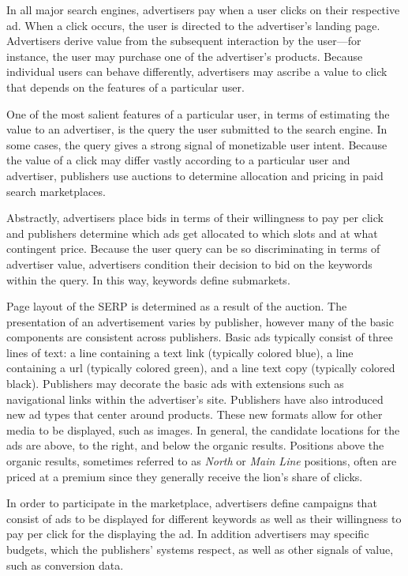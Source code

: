 \documentclass[prodmode,acmtist]{acmsmall} %
\begin{document}
In all major search engines, advertisers pay when a user clicks on their respective ad.  
When a click occurs, the user is directed to the advertiser's landing page.  
Advertisers derive value from the subsequent interaction by the user---for instance, the user may purchase one of the advertiser's products.  
Because individual users can behave differently, advertisers may ascribe a value to click that depends on the features of a particular user. 

One of the most salient features of a particular user, in terms of estimating the value to an advertiser, is the query the user submitted to the search engine.  
In some cases, the query gives a strong signal of monetizable user intent.  
Because the value of a click may differ vastly according to a particular user and advertiser, publishers use auctions to determine allocation and pricing in paid search marketplaces. 

Abstractly, advertisers place bids in terms of their willingness to pay per click and publishers determine which ads get allocated to which slots and at what contingent price.  
Because the user query can be so discriminating in terms of advertiser value, advertisers condition their decision to bid on the keywords within the query.  
In this way, keywords define submarkets. 

Page layout of the SERP is determined as a result of the auction.
The presentation of an advertisement varies by publisher, however many of the basic components are consistent across publishers.
Basic ads typically consist of three lines of text: a line containing a text link (typically colored blue), a line containing a url (typically colored green), and a line text copy (typically colored black). 
Publishers may decorate the basic ads with extensions such as navigational links within the advertiser's site.  
Publishers have also introduced new ad types that center around products.  
These new formats allow for other media to be displayed, such as images. 
In general, the candidate locations for the ads are above, to the right, and below the organic results.  
Positions above the organic results, sometimes referred to as \emph{North} or \emph{Main Line} positions, often are priced at a premium since they generally receive the lion's share of clicks.

In order to participate in the marketplace, advertisers define campaigns that consist of ads to be displayed for different keywords as well as their willingness to pay per click for the displaying the ad.  
In addition advertisers may specific budgets, which the publishers' systems respect, as well as other signals of value, such as conversion data. 
\end{document}
